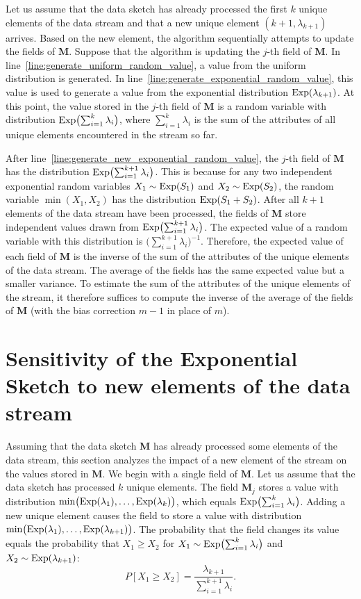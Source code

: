 Let us assume that the data sketch has already processed the first $k$ unique elements of the data stream and that a new unique element $(k+1, \lambda_{k+1})$ arrives. Based on the new element, the algorithm sequentially attempts to update the fields of $\mathbf{M}$. Suppose that the algorithm is updating the $j$-th field of $\mathbf{M}$. In line~\ref{line:generate_uniform_random_value}, a value from the uniform distribution is generated. In line~\ref{line:generate_exponential_random_value}, this value is used to generate a value from the exponential distribution $\operatorname{Exp}(\lambda_{k+1})$. At this point, the value stored in the $j$-th field of $\mathbf{M}$ is a random variable with distribution $\operatorname{Exp}\bigl(\sum_{i=1}^{k} \lambda_i\bigr)$, where $\sum_{i=1}^{k} \lambda_i$ is the sum of the attributes of all unique elements encountered in the stream so far.

After line~\ref{line:generate_new_exponential_random_value}, the $j$-th field of $\mathbf{M}$ has the distribution $\operatorname{Exp}\bigl(\sum_{i=1}^{k+1} \lambda_i\bigr)$. This is because for any two independent exponential random variables $X_1 \sim \operatorname{Exp}(S_1)$ and $X_2 \sim \operatorname{Exp}(S_2)$, the random variable $\min(X_1, X_2)$ has the distribution $\operatorname{Exp}(S_1 + S_2)$. After all $k+1$ elements of the data stream have been processed, the fields of $\mathbf{M}$ store independent values drawn from $\operatorname{Exp}\bigl(\sum_{i=1}^{k+1} \lambda_i\bigr)$. The expected value of a random variable with this distribution is $\bigl(\sum_{i=1}^{k+1} \lambda_i\bigr)^{-1}$. Therefore, the expected value of each field of $\mathbf{M}$ is the inverse of the sum of the attributes of the unique elements of the data stream. The average of the fields has the same expected value but a smaller variance. To estimate the sum of the attributes of the unique elements of the stream, it therefore suffices to compute the inverse of the average of the fields of $\mathbf{M}$ (with the bias correction $m - 1$ in place of $m$).

\section{Sensitivity of the Exponential Sketch to new elements of the data stream}

Assuming that the data sketch $\mathbf{M}$ has already processed some elements of the data stream, this section analyzes the impact of a new element of the stream on the values stored in $\mathbf{M}$. We begin with a single field of $\mathbf{M}$. Let us assume that the data sketch has processed $k$ unique elements. The field $\mathbf{M}_j$ stores a value with distribution $\min\bigl(\operatorname{Exp}(\lambda_1), \ldots, \operatorname{Exp}(\lambda_k)\bigr)$, which equals $\operatorname{Exp}\bigl(\sum_{i=1}^{k} \lambda_i\bigr)$. Adding a new unique element causes the field to store a value with distribution $\min\bigl(\operatorname{Exp}(\lambda_1), \ldots, \operatorname{Exp}(\lambda_{k+1})\bigr)$. The probability that the field changes its value equals the probability that $X_1 \geq X_2$ for $X_1 \sim \operatorname{Exp}\bigl(\sum_{i=1}^{k} \lambda_i\bigr)$ and $X_2 \sim \operatorname{Exp}(\lambda_{k+1})$:
\[
P[X_1 \geq X_2] = \frac{\lambda_{k+1}}{\sum_{i=1}^{k+1} \lambda_i}.
\]

